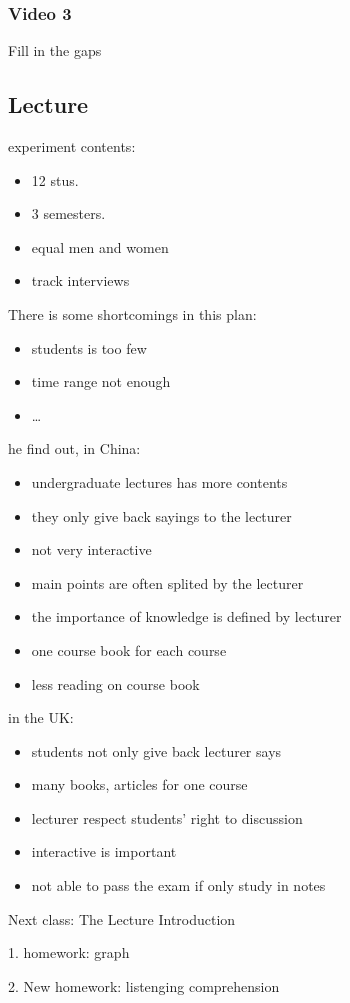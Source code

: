\subsubsection*{Video 3}%
\label{subsub*:Video-3}
Fill in the gaps
\subsection{Lecture}%
\label{sub:Lecture}
experiment contents: 
\begin{itemize}
    \item 12 stus.
    \item 3 semesters.
    \item equal men and women
    \item track interviews
\end{itemize}
\begin{notation}
    There is some shortcomings in this plan: 
    \begin{itemize}
        \item students is too few
        \item time range not enough
        \item \ldots 
    \end{itemize}
\end{notation}
he find out, in China: 
\begin{itemize}
    \item undergraduate lectures has more contents
    \item they only give back sayings to the lecturer
    \item not very interactive
    \item main points are often splited by the lecturer
    \item the importance of knowledge is defined by lecturer
    \item one course book for each course
    \item less reading on course book
\end{itemize}
in the UK:
\begin{itemize}
    \item students not only give back lecturer says
    \item many books, articles for one course
    \item lecturer respect students' right to discussion
    \item interactive is important
    \item not able to pass the exam if only study in notes
\end{itemize}
\begin{notation}
    Next class: The Lecture Introduction

    1. homework: graph

    2. New homework: listenging comprehension
\end{notation}
